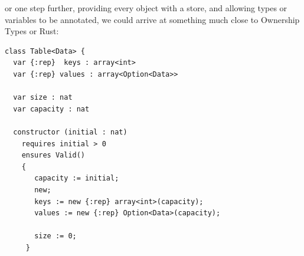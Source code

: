 \noindent or one step further, providing every object with a store,
and allowing types or variables to be annotated, we could arrive at
something much close to Ownership Types \cite{noble_flexible_1998} or Rust:

\begin{lstlisting}
class Table<Data> {
  var {:rep}  keys : array<int>
  var {:rep} values : array<Option<Data>>

  var size : nat
  var capacity : nat
    
  constructor (initial : nat)
    requires initial > 0
    ensures Valid()
    {  
       capacity := initial;
       new;
       keys := new {:rep} array<int>(capacity);
       values := new {:rep} Option<Data>(capacity);

       size := 0;
     }
 
\end{lstlisting}











